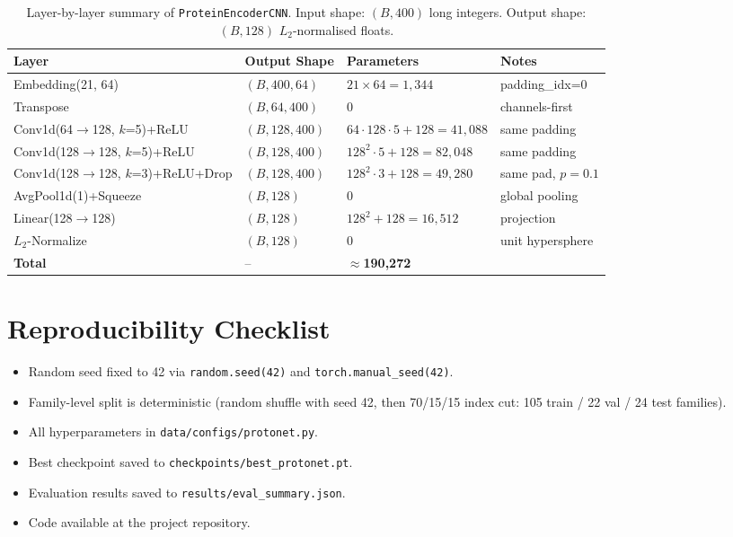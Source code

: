 \documentclass[11pt,a4paper]{article}
\begin{document}
\begin{table}[H]
\centering
\caption{Layer-by-layer summary of \texttt{ProteinEncoderCNN}.
         Input shape: $(B, 400)$ long integers.
         Output shape: $(B, 128)$ $L_2$-normalised floats.}
\label{tab:arch}
\footnotesize
\begin{tabular}{p{4.2cm}p{2.6cm}p{4.0cm}p{2.8cm}}
\toprule
\textbf{Layer} & \textbf{Output Shape} & \textbf{Parameters} & \textbf{Notes} \\
\midrule
Embedding(21, 64) & $(B, 400, 64)$ & $21 \times 64 = 1{,}344$ & padding\_idx=0 \\
Transpose         & $(B, 64, 400)$ & 0 & channels-first \\
Conv1d(64$\to$128, $k$=5)+ReLU & $(B, 128, 400)$ & $64\!\cdot\!128\!\cdot\!5+128=41{,}088$ & same padding \\
Conv1d(128$\to$128, $k$=5)+ReLU & $(B, 128, 400)$ & $128^2\!\cdot\!5+128=82{,}048$ & same padding \\
Conv1d(128$\to$128, $k$=3)+ReLU+Drop & $(B, 128, 400)$ & $128^2\!\cdot\!3+128=49{,}280$ & same pad, $p{=}0.1$ \\
AvgPool1d(1)+Squeeze & $(B, 128)$ & 0 & global pooling \\
Linear(128$\to$128) & $(B, 128)$ & $128^2+128=16{,}512$ & projection \\
$L_2$-Normalize & $(B, 128)$ & 0 & unit hypersphere \\
\midrule
\textbf{Total} & -- & $\approx$\textbf{190{,}272} & \\
\bottomrule
\end{tabular}
\end{table}

\section{Reproducibility Checklist}
\label{app:repro}

\begin{itemize}[noitemsep]
  \item Random seed fixed to 42 via \texttt{random.seed(42)} and
        \texttt{torch.manual\_seed(42)}.
  \item Family-level split is deterministic (random shuffle with seed 42, then
        70/15/15 index cut: 105 train / 22 val / 24 test families).
  \item All hyperparameters in \texttt{data/configs/protonet.py}.
  \item Best checkpoint saved to \texttt{checkpoints/best\_protonet.pt}.
  \item Evaluation results saved to \texttt{results/eval\_summary.json}.
  \item Code available at the project repository.
\end{itemize}
\end{document}
